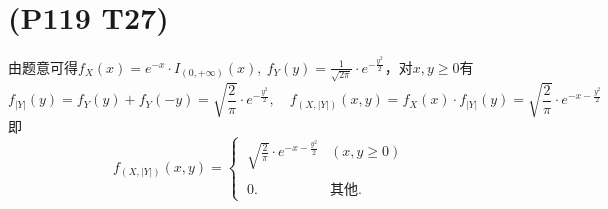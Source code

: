 \documentclass{article}
\begin{document}
\section{(P119 T27)}  %
由题意可得$f_{X} (x)= e^{-x}\cdot I_{(0,+\infty)}(x),\  f_{Y} (y) = \displaystyle{\frac{1}{\sqrt{2\pi}}\cdot e^{-\frac{y^2}{2}}}$，对$x,y\geq 0$有
\[
    f_{|Y|}(y) = f_{Y} (y) + f_{Y} (-y) = \sqrt{\frac{2}{\pi}}\cdot e^{-\frac{y^2}{2}} ,\quad
    f_{(X,|Y|)} (x,y) = f_{X}(x) \cdot f_{|Y|}(y) = \sqrt{\frac{2}{\pi}}\cdot e^{-x-\frac{y^2}{2}}
\]
即
\[
    f_{(X,|Y|)} (x,y) 
    =
    \begin{cases}
        \ \displaystyle{\sqrt{\frac{2}{\pi}}}\cdot e^{-x-\frac{y^2}{2}} & (x,y \geq 0)\\
        \\
        \ 0. & \mbox{其他}.
    \end{cases}
\]
\end{document}
